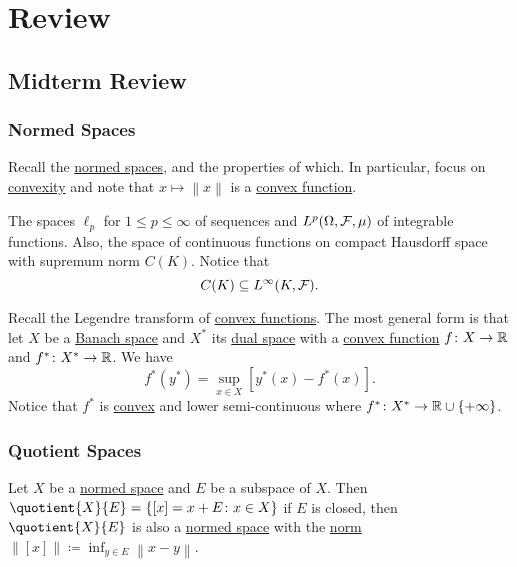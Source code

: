 \chapter{Review}
\section{Midterm Review}
\subsection{Normed Spaces}
Recall the \hyperref[def:normed-vector-space]{normed spaces}, and the properties of which. In particular, focus on \hyperref[def:convex-function]{convexity} and note that \(x\mapsto \left\lVert x\right\rVert \) is a \hyperref[def:convex-function]{convex function}.

\begin{eg}
	The spaces \(\ell _p\) for \(1 \leq p \leq \infty \) of sequences and \(L^p(\Omega , \mathcal{\MakeUppercase{f}} , \mu )\) of integrable functions. Also, the space of continuous functions on compact Hausdorff space with supremum norm \(C(K)\). Notice that
	\[
		C(K) \subseteq L^{\infty} (K, \mathcal{\MakeUppercase{f}}).
	\]
\end{eg}

\begin{remark}
	Recall the Legendre transform of \hyperref[def:convex-function]{convex functions}. The most general form is that let \(X\) be a \hyperref[def:Banach-space]{Banach space} and \(X^{\ast} \) its \hyperref[def:dual-space]{dual space} with a \hyperref[def:convex-function]{convex function} \(f\colon X\to \mathbb{\MakeUppercase{r}} \) and \(f^{\ast} \colon X^{\ast} \to \mathbb{\MakeUppercase{r}} \). We have
	\[
		f^{\ast} (y^{\ast} ) = \sup _{x\in X}\left[ y^{\ast} (x) - f^{\ast} (x) \right].
	\]
	Notice that \(f^{\ast} \) is \hyperref[def:convex-function]{convex} and lower semi-continuous where \(f^{\ast} \colon X^{\ast} \to \mathbb{\MakeUppercase{r}} \cup \left\{ +\infty  \right\} \).
\end{remark}

\subsection{Quotient Spaces}
Let \(X\) be a \hyperref[def:normed-vector-space]{normed space} and \(E\) be a subspace of \(X\). Then \(\quotient{X}{E} = \left\{ [x] = x+E\colon x\in X \right\}  \) if \(E\) is closed, then \(\quotient{X}{E} \) is also a \hyperref[def:normed-vector-space]{normed space} with the \hyperref[def:norm]{norm} \(\left\lVert [x]\right\rVert \coloneqq \inf _{y\in E}\left\lVert x- y\right\rVert\).

